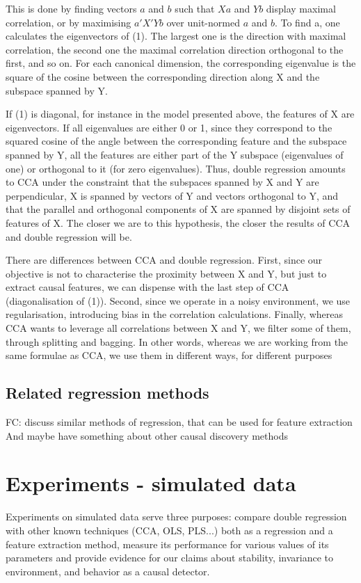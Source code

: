 \documentclass{article}
\begin{document}
This is done by finding vectors $a$ and $b$ such that $Xa$ and $Yb$ display maximal correlation, or by maximising $a'X'Yb$ over unit-normed $a$ and $b$. To find a, one calculates the eigenvectors of (1). The largest one is the direction with maximal correlation, the second one the maximal correlation direction orthogonal to the first, and so on. For each canonical dimension, the corresponding eigenvalue is the square of the cosine between the corresponding direction along X and the subspace spanned by Y.  

If (1) is diagonal, for instance in the model presented above, the features of X are eigenvectors. If all eigenvalues are either 0 or 1, since they correspond to the squared cosine of the angle between the corresponding feature and the subspace spanned by Y, all the features are either part of the Y subspace (eigenvalues of one) or orthogonal to it (for zero eigenvalues). Thus, double regression amounts to CCA under the constraint that the subspaces spanned by X and Y are perpendicular, X is spanned by vectors of Y and vectors orthogonal to Y, and that the parallel and orthogonal components of X are spanned by disjoint sets of features of X. The closer we are to this hypothesis, the closer the results of CCA and double regression will be.

There are differences between CCA and double regression. First, since our objective is not to characterise the proximity between X and Y, but just to extract causal features, we can dispense with the last step of CCA (diagonalisation of (1)). Second, since we operate in a noisy environment, we use regularisation, introducing bias in the correlation calculations. Finally, whereas CCA wants to leverage all correlations between X and Y, we filter some of them, through splitting and bagging. In other words, whereas we are working from the same formulae as CCA, we use them in different ways, for different purposes
  

\subsection{Related regression methods}
FC: discuss similar methods of regression, that can be used for feature extraction
And maybe have something about other causal discovery methods


\section{Experiments - simulated data}
Experiments on simulated data serve three purposes: compare double regression with other known techniques (CCA, OLS, PLS...) both as a regression and a feature extraction method, measure its performance for various values of its parameters and provide evidence for our claims about stability, invariance to environment, and behavior as a causal detector.
\end{document}

